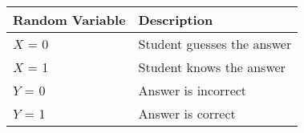 \begin{tabular}{|l|l|}\hline
	Random Variable	&Description \\ \hline
	$X$ = 0 &Student guesses the answer \\ \hline
	$X$ = 1 &Student knows the answer \\ \hline
	$Y$ = 0 &Answer is incorrect \\ \hline
	$Y$ = 1	&Answer is correct \\ \hline
\end{tabular}

